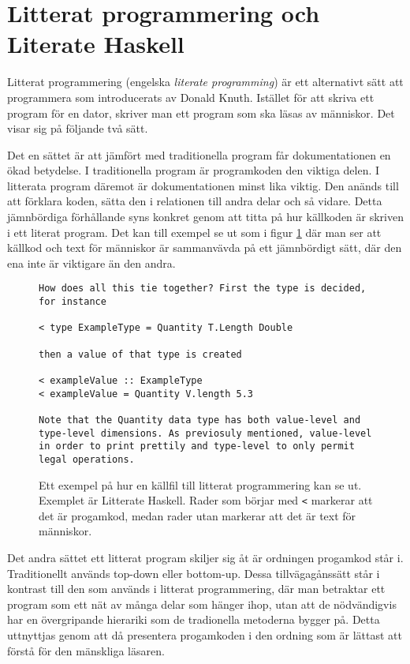 \section{Litterat programmering och Literate Haskell}
\label{sec:lhs}
\begin{draft}
Litterat programmering (engelska \textit{literate programming}) är ett
alternativt sätt att programmera som introducerats av Donald Knuth.\cite{knuth}
Istället för att skriva ett program för en dator, skriver man ett program som
ska läsas av människor. Det visar sig på följande två sätt.

Det en sättet är att jämfört med traditionella program får dokumentationen en
ökad betydelse. I traditionella program är programkoden den viktiga delen. I
litterata program däremot är dokumentationen minst lika viktig. Den anänds till
att förklara koden, sätta den i relationen till andra delar och så vidare.
Detta jämnbördiga förhållande syns konkret genom att titta på hur källkoden är
skriven i ett literat program. Det kan till exempel se ut som i figur
\ref{fig:litterate_haskell_exempel} där man ser att källkod och text för
människor är sammanvävda på ett jämnbördigt sätt, där den ena inte är viktigare
än den andra. 

\begin{figure}[tph]
  \begin{lstlisting}[language={}]
How does all this tie together? First the type is decided, for instance

< type ExampleType = Quantity T.Length Double

then a value of that type is created

< exampleValue :: ExampleType
< exampleValue = Quantity V.length 5.3

Note that the Quantity data type has both value-level and type-level dimensions. As previosuly mentioned, value-level in order to print prettily and type-level to only permit legal operations.
  \end{lstlisting}
  \caption{Ett exempel på hur en källfil till litterat programmering kan se ut. Exemplet är Litterate Haskell. Rader som börjar med \texttt{<} markerar att det är progamkod, medan rader utan markerar att det är text för människor.}
  \label{fig:litterate_haskell_exempel}
\end{figure}

Det andra sättet ett litterat program skiljer sig åt är ordningen progamkod
står i. Traditionellt används top-down eller bottom-up. Dessa tillvägagånssätt
står i kontrast till den som används i litterat programmering, där man
betraktar ett program som ett nät av många delar som hänger ihop, utan att de
nödvändigvis har en övergripande hierariki som de tradionella metoderna bygger
på. Detta uttnyttjas genom att då presentera progamkoden i den ordning som är
lättast att förstå för den mänskliga läsaren.


\end{draft}
